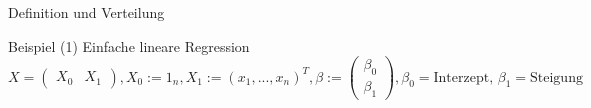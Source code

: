 \documentclass[
  8pt,
  ignorenonframetext,
]{beamer}
\begin{document}
\begin{frame}[fragile]{Definition und Verteilung}
\protect\hypertarget{definition-und-verteilung-6}{}
\vspace{2mm}
\small

Beispiel (1) Einfache lineare Regression \footnotesize \begin{equation}
X = \begin{pmatrix} X_0 & X_1 \end{pmatrix}, X_0 := 1_{n}, X_1 := (x_1,...,x_n)^T,
\beta  := \begin{pmatrix} \beta_0 \\ \beta_1 \end{pmatrix},
\beta_0 = \mbox{Interzept,  }
\beta_1 = \mbox{Steigung }
\end{equation} \tiny


\end{frame}
\end{document}

